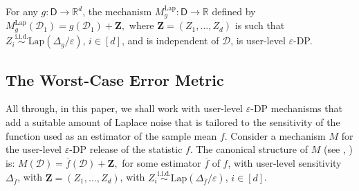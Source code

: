 \begin{theorem}
	\label{thm:dp}
	For any $g: \mathsf{D}\to \mathbb{R}^d$, the mechanism $M^{\text{Lap}}_g: \mathsf{D}\to \mathbb{R}$ defined by
	$
	M^{\text{Lap}}_g(\mathcal{D}_1) = g(\mathcal{D}_1)+\mathbf{Z},
	$
	where $\mathbf{Z} = (Z_1,\ldots,Z_d)$ is such that $Z_i\stackrel{\text{i.i.d.}}{\sim} \text{Lap}(\Delta_g/\varepsilon)$, $i\in [d]$, and is independent of $\mathcal{D}$, is user-level $\varepsilon$-DP.
\end{theorem}

\subsection{The Worst-Case Error Metric}

All through, in this paper, we shall work with user-level $\varepsilon$-DP mechanisms that add a suitable amount of Laplace noise that is tailored to the sensitivity of the function used as an estimator of the sample mean $f$. %
Consider a mechanism $M$ for the user-level $\varepsilon$-DP release of the statistic $f$. The canonical structure of $M$ (see \cite[Footnote 1]{staircase}, \cite{opt}) is: $M(\mathcal{D}) = \overline{f}(\mathcal{D})+{\mathbf{Z}},$
for some estimator $\overline{f}$ of $f$, with user-level sensitivity $\Delta_{\overline{f}}$, with $\mathbf{Z} = (Z_1,\ldots,Z_d)$, with $Z_i\stackrel{\text{i.i.d.}}{\sim} \text{Lap}\left(\Delta_{\overline{f}}/\varepsilon\right)$, $i\in [d]$.  




